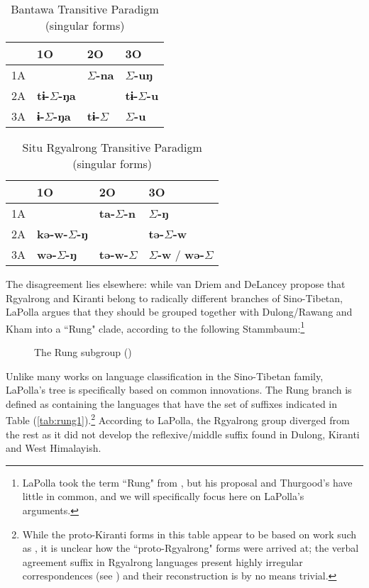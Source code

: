 \documentclass[oldfontcommands,oneside,a4paper,11pt]{article}
\newcommand{\ipa}[1]{{\phon\textbf{#1}}}
\newcommand{\grise}[1]{\cellcolor{lightgray}\textbf{#1}}
\newcommand{\ra}{$\Sigma$}
\begin{document}
 \begin{table}[H]
 \caption{Bantawa Transitive Paradigm (singular forms)} \centering \label{tab:bantawa}
 \begin{tabular}{l|l|l|l|}
  &1O&2O&3O\\
 \hline
1A & 	\grise{} & 	\ipa{\ra{}-na} & 	\ipa{\ra{}-uŋ} \\ 
2A & 	\ipa{tɨ-\ra{}-ŋa} & 	\grise{}	 & 	\ipa{tɨ-\ra{}-u} \\ 
3A & 	\ipa{ɨ-\ra{}-ŋa} & 	\ipa{tɨ-\ra{}} & 	\ipa{\ra{}-u} \\ 
 \hline
\end{tabular}
\end{table}

 \begin{table}[H]
 \caption{Situ Rgyalrong Transitive Paradigm (singular forms)} \centering \label{tab:situ}
 \begin{tabular}{l|l|l|l|}
  &1O&2O&3O\\
 \hline
1A & 	\grise{} & 	\ipa{ta-\ra{}-n} & 	\ipa{\ra{}-ŋ} \\ 
2A & 	\ipa{kə-w-\ra{}-ŋ} & 	\grise{}	 & 	\ipa{tə-\ra{}-w} \\ 
3A & 	\ipa{wə-\ra{}-ŋ} & 	\ipa{tə-w-\ra{}} & 	\ipa{\ra{}-w} / \ipa{wə-\ra{}} \\ 
 \hline
\end{tabular}
\end{table}


The  disagreement lies elsewhere: while van Driem and DeLancey propose that Rgyalrong and Kiranti belong to radically different branches of Sino-Tibetan, LaPolla argues that they should be grouped together with Dulong/Rawang and Kham into a ``Rung" clade, according to the following Stammbaum:\footnote{LaPolla took the term ``Rung" from \citet{thurgood85pro} , but his proposal and Thurgood's have little in common, and we will specifically focus here on LaPolla's arguments. }
\begin{figure}[H]
\caption{The Rung subgroup (\citealt[394]{lapolla05st})} \label{fig:rung}
\begin{newicktree}
  \small
  \setunitlength{20cm} \righttree \nobranchlengths \nodelabelformat{}
  \par \scalebar[0.1]
\end{newicktree}
\end{figure}

Unlike many works on language classification in the Sino-Tibetan family, LaPolla's tree is specifically based on   common innovations. The Rung branch is defined as containing the languages that have the set of suffixes indicated in Table (\ref{tab:rung1}).\footnote{While the proto-Kiranti forms in this table appear to be based on  work such as \citet{driem93agreement}, it is unclear how the ``proto-Rgyalrong" forms  were arrived at; the verbal agreement suffix in Rgyalrong languages present highly irregular correspondences (see \citealt{gongxun14agreement}) and their reconstruction is by no means trivial. } According to LaPolla, the Rgyalrong group diverged from the rest as it did not develop the reflexive/middle suffix found in Dulong, Kiranti and West Himalayish.
\end{document}
